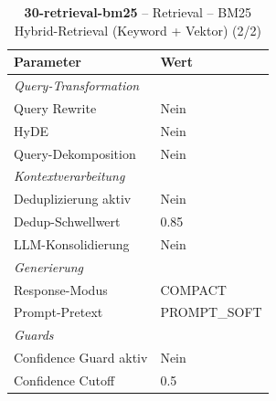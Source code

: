 \begin{table}[H]
\centering
\small
\setlength{\tabcolsep}{4pt}
\begin{tabular}{lp{8cm}}
\toprule
\textbf{Parameter} & \textbf{Wert} \\
\midrule
\multicolumn{2}{l}{\textit{Query-Transformation}} \\
\midrule
\quad Query Rewrite & Nein \\
\quad HyDE & Nein \\
\quad Query-Dekomposition & Nein \\
\midrule
\multicolumn{2}{l}{\textit{Kontextverarbeitung}} \\
\midrule
\quad Deduplizierung aktiv & Nein \\
\quad Dedup-Schwellwert & 0.85 \\
\quad LLM-Konsolidierung & Nein \\
\midrule
\multicolumn{2}{l}{\textit{Generierung}} \\
\midrule
\quad Response-Modus & COMPACT \\
\quad Prompt-Pretext & PROMPT\_SOFT \\
\midrule
\multicolumn{2}{l}{\textit{Guards}} \\
\midrule
\quad Confidence Guard aktiv & Nein \\
\quad Confidence Cutoff & 0.5 \\
\bottomrule
\end{tabular}
\caption{\textbf{30-retrieval-bm25} -- Retrieval -- BM25 Hybrid-Retrieval (Keyword + Vektor) (2/2)}
\label{tab:config_30_retrieval_bm25_b}
\end{table}